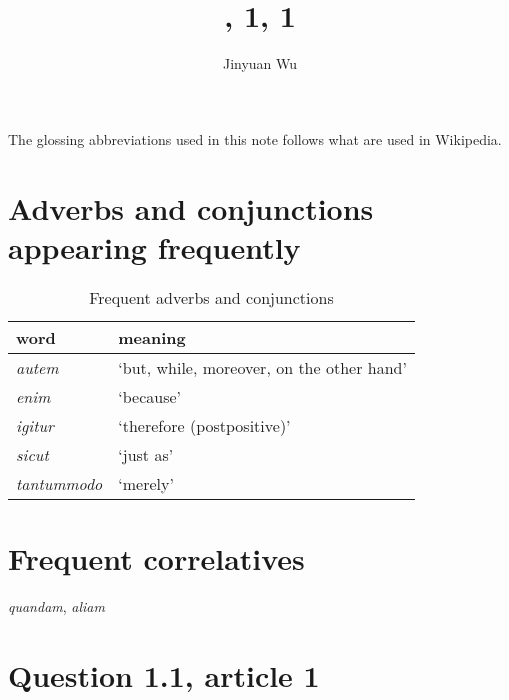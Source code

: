 \documentclass[a4paper, 12pt]{article}
\title{\form{Summa}, 1, 1}
\author{Jinyuan Wu}
\newcommand{\form}[1]{\emph{#1}}
\newcommand{\translate}[1]{`#1'}
\begin{document}
\maketitle

The glossing abbreviations used in this note 
follows what are used in Wikipedia.

\section{Adverbs and conjunctions appearing frequently}

\begin{table}[H]
    \caption{Frequent adverbs and conjunctions}
    \centering
    \begin{tabular}{ll}
        \toprule
        word               & meaning \\
        \midrule
        \form{autem}       & \translate{but, while, moreover, on the other hand}    \\
        \form{enim}        & \translate{because} \\
        \form{igitur}      & \translate{therefore (postpositive)}                   \\
        \form{sicut}       & \translate{just as}                                    \\
        \form{tantummodo}  & \translate{merely}                                     \\
        \bottomrule
    \end{tabular}
\end{table}


\section{Frequent correlatives}

\form{quandam}, \form{aliam}

\section{Question 1.1, article 1}
\end{document}
